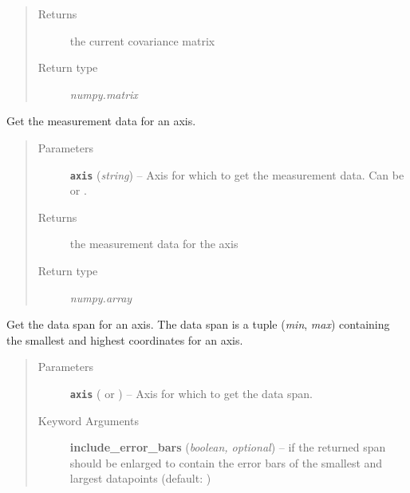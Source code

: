 \documentclass[a4paper,10pt,english]{sphinxmanual}
\begin{document}
\begin{fulllineitems}
\begin{fulllineitems}
\begin{quote}
\begin{description}
\item[{Returns}] \leavevmode
the current covariance matrix

\item[{Return type}] \leavevmode
\emph{numpy.matrix}

\end{description}\end{quote}

\end{fulllineitems}


\begin{fulllineitems}
\label{index:kafe.dataset.Dataset.get_data}
Get the measurement data for an axis.
\begin{quote}\begin{description}
\item[{Parameters}] \leavevmode
\textbf{\texttt{axis}} (\emph{string}) -- Axis for which to get the measurement data. Can be  or
.

\item[{Returns}] \leavevmode
the measurement data for the axis

\item[{Return type}] \leavevmode
\emph{numpy.array}

\end{description}\end{quote}

\end{fulllineitems}


\begin{fulllineitems}
\label{index:kafe.dataset.Dataset.get_data_span}
Get the data span for an axis. The data span is a tuple (\emph{min}, \emph{max})
containing the smallest and highest coordinates for an axis.
\begin{quote}\begin{description}
\item[{Parameters}] \leavevmode
\textbf{\texttt{axis}} ( or ) -- Axis for which to get the data span.

\item[{Keyword Arguments}] \leavevmode
\textbf{include\_error\_bars} (\emph{boolean, optional}) --
 if the returned span should be enlarged to
contain the error bars of the smallest and largest datapoints
(default: )


\end{description}
\end{quote}
\end{fulllineitems}
\end{fulllineitems}
\end{document}
